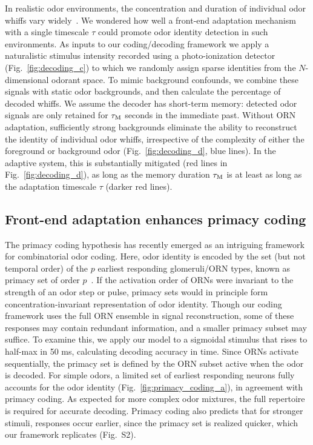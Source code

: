 \documentclass[9pt,twocolumn,twoside]{pnas-new}
\begin{document}
In realistic odor environments, the concentration and duration of individual odor whiffs vary widely~\cite{celani}. We wondered how well a front-end adaptation mechanism with a single timescale $\tau$ could promote odor identity detection in such environments. As inputs to our coding/decoding framework we apply a naturalistic stimulus intensity recorded using a photo-ionization detector~\cite{srinivas_elife} (Fig.~\ref{fig:decoding_c}) to which we randomly assign sparse identities from the $N$-dimensional odorant space. To mimic background confounds, we combine these signals with static odor backgrounds, and then calculate the percentage of decoded whiffs. We assume the decoder has short-term memory: detected odor signals are only retained for $\tau_{\textup {M}}$ seconds in the immediate past. Without ORN adaptation, sufficiently strong backgrounds eliminate the ability to reconstruct the identity of individual odor whiffs, irrespective of the complexity of either the foreground or background odor (Fig.~\ref{fig:decoding_d}, blue lines). In the adaptive system, this is substantially mitigated (red lines in Fig.~\ref{fig:decoding_d}), as long as the memory duration $\tau_{\textup {M}}$ is at least as long as the adaptation timescale $\tau$ (darker red lines). %





\subsection*{Front-end adaptation enhances primacy coding}

The primacy coding hypothesis has recently emerged as an intriguing framework for combinatorial odor coding. Here, odor identity is encoded by the set (but not temporal order) of the $p$ earliest responding glomeruli/ORN types, known as primacy set of order $p$~\cite{primacy_coding}. If the activation order of ORNs were invariant to the strength of an odor step or pulse, primacy sets would in principle form concentration-invariant representation of odor identity. Though our coding framework uses the full ORN ensemble in signal reconstruction, some of these responses may contain redundant information, and a smaller primacy subset may suffice. To examine this, we apply our model to a sigmoidal stimulus that rises to half-max in 50 ms, calculating decoding accuracy in time. Since ORNs activate sequentially, the primacy set is defined by the ORN subset active when the odor is decoded. For simple odors, a limited set of earliest responding neurons fully accounts for the odor identity (Fig.~\ref{fig:primacy_coding_a}), in agreement with primacy coding. As expected for more complex odor mixtures, the full repertoire is required for accurate decoding. Primacy coding also predicts that for stronger stimuli, responses occur earlier, since the primacy set is realized quicker, which our framework replicates (Fig.~S2).
\end{document}

